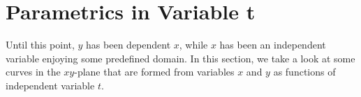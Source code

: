 \section{Parametrics in Variable t}

Until this point, $y$ has been dependent $x$, while $x$ has been an independent variable enjoying some predefined domain. In this section, we take a look at some curves in the $xy$-plane that are formed from variables $x$ and $y$ as functions of independent variable $t$. 